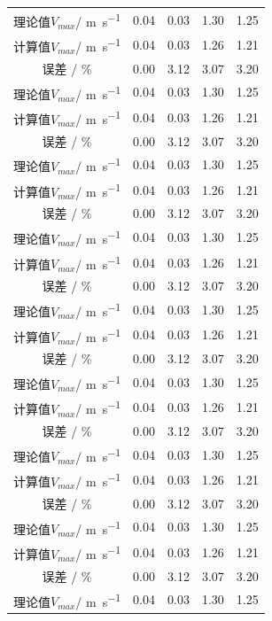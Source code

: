 \documentclass[bachelor]{XJTUthesis}
\begin{document}
\begin{longtable}{ccccc}
    理论值$V_{max}$/ \si{m.s^{-1}} & 0.04 & 0.03 & 1.30 & 1.25 \\
    计算值$V_{max}$/ \si{m.s^{-1}} & 0.04 & 0.03 & 1.26 & 1.21\\
    误差 / \%                      & 0.00 & 3.12 & 3.07 & 3.20\\
    理论值$V_{max}$/ \si{m.s^{-1}} & 0.04 & 0.03 & 1.30 & 1.25 \\
    计算值$V_{max}$/ \si{m.s^{-1}} & 0.04 & 0.03 & 1.26 & 1.21\\
    误差 / \%                      & 0.00 & 3.12 & 3.07 & 3.20\\
    理论值$V_{max}$/ \si{m.s^{-1}} & 0.04 & 0.03 & 1.30 & 1.25 \\
    计算值$V_{max}$/ \si{m.s^{-1}} & 0.04 & 0.03 & 1.26 & 1.21\\
    误差 / \%                      & 0.00 & 3.12 & 3.07 & 3.20\\
    理论值$V_{max}$/ \si{m.s^{-1}} & 0.04 & 0.03 & 1.30 & 1.25 \\
    计算值$V_{max}$/ \si{m.s^{-1}} & 0.04 & 0.03 & 1.26 & 1.21\\
    误差 / \%                      & 0.00 & 3.12 & 3.07 & 3.20\\
    理论值$V_{max}$/ \si{m.s^{-1}} & 0.04 & 0.03 & 1.30 & 1.25 \\
    计算值$V_{max}$/ \si{m.s^{-1}} & 0.04 & 0.03 & 1.26 & 1.21\\
    误差 / \%                      & 0.00 & 3.12 & 3.07 & 3.20\\
    理论值$V_{max}$/ \si{m.s^{-1}} & 0.04 & 0.03 & 1.30 & 1.25 \\
    计算值$V_{max}$/ \si{m.s^{-1}} & 0.04 & 0.03 & 1.26 & 1.21\\
    误差 / \%                      & 0.00 & 3.12 & 3.07 & 3.20\\
    理论值$V_{max}$/ \si{m.s^{-1}} & 0.04 & 0.03 & 1.30 & 1.25 \\
    计算值$V_{max}$/ \si{m.s^{-1}} & 0.04 & 0.03 & 1.26 & 1.21\\
    误差 / \%                      & 0.00 & 3.12 & 3.07 & 3.20\\
    理论值$V_{max}$/ \si{m.s^{-1}} & 0.04 & 0.03 & 1.30 & 1.25 \\
    计算值$V_{max}$/ \si{m.s^{-1}} & 0.04 & 0.03 & 1.26 & 1.21\\
    误差 / \%                      & 0.00 & 3.12 & 3.07 & 3.20\\
    理论值$V_{max}$/ \si{m.s^{-1}} & 0.04 & 0.03 & 1.30 & 1.25 \\

\end{longtable}
\end{document}
